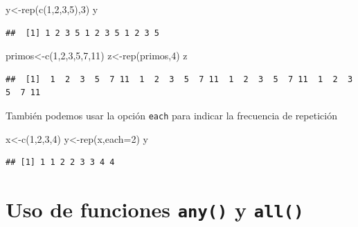 \documentclass[
]{book}
\newenvironment{Shaded}{\begin{snugshade}}{\end{snugshade}}
\newcommand{\AttributeTok}[1]{\textcolor[rgb]{0.77,0.63,0.00}{#1}}
\newcommand{\DecValTok}[1]{\textcolor[rgb]{0.00,0.00,0.81}{#1}}
\newcommand{\FunctionTok}[1]{\textcolor[rgb]{0.00,0.00,0.00}{#1}}
\newcommand{\NormalTok}[1]{#1}
\newcommand{\OtherTok}[1]{\textcolor[rgb]{0.56,0.35,0.01}{#1}}
\begin{document}
\begin{Shaded}
\begin{Highlighting}[]
\NormalTok{y}\OtherTok{\textless{}{-}}\FunctionTok{rep}\NormalTok{(}\FunctionTok{c}\NormalTok{(}\DecValTok{1}\NormalTok{,}\DecValTok{2}\NormalTok{,}\DecValTok{3}\NormalTok{,}\DecValTok{5}\NormalTok{),}\DecValTok{3}\NormalTok{)}
\NormalTok{y}
\end{Highlighting}
\end{Shaded}

\begin{verbatim}
##  [1] 1 2 3 5 1 2 3 5 1 2 3 5
\end{verbatim}

\begin{Shaded}
\begin{Highlighting}[]
\NormalTok{primos}\OtherTok{\textless{}{-}}\FunctionTok{c}\NormalTok{(}\DecValTok{1}\NormalTok{,}\DecValTok{2}\NormalTok{,}\DecValTok{3}\NormalTok{,}\DecValTok{5}\NormalTok{,}\DecValTok{7}\NormalTok{,}\DecValTok{11}\NormalTok{)}
\NormalTok{z}\OtherTok{\textless{}{-}}\FunctionTok{rep}\NormalTok{(primos,}\DecValTok{4}\NormalTok{)}
\NormalTok{z}
\end{Highlighting}
\end{Shaded}

\begin{verbatim}
##  [1]  1  2  3  5  7 11  1  2  3  5  7 11  1  2  3  5  7 11  1  2  3  5  7 11
\end{verbatim}

También podemos usar la opción \texttt{each} para indicar la frecuencia de repetición

\begin{Shaded}
\begin{Highlighting}[]
\NormalTok{x}\OtherTok{\textless{}{-}}\FunctionTok{c}\NormalTok{(}\DecValTok{1}\NormalTok{,}\DecValTok{2}\NormalTok{,}\DecValTok{3}\NormalTok{,}\DecValTok{4}\NormalTok{)}
\NormalTok{y}\OtherTok{\textless{}{-}}\FunctionTok{rep}\NormalTok{(x,}\AttributeTok{each=}\DecValTok{2}\NormalTok{)}
\NormalTok{y}
\end{Highlighting}
\end{Shaded}

\begin{verbatim}
## [1] 1 1 2 2 3 3 4 4
\end{verbatim}

\hypertarget{uso-de-funciones-any-y-all}{%
\section{\texorpdfstring{Uso de funciones \texttt{any()} y \texttt{all()}}{Uso de funciones any() y all()}}\label{uso-de-funciones-any-y-all}}
\end{document}
